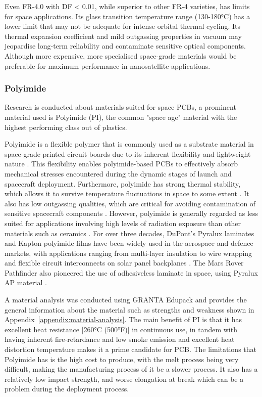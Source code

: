 Even FR-4.0 with DF < 0.01, while superior to other FR-4 varieties, has limits for space applications.
Its glass transition temperature range (130-180°C) has a lower limit that may not be adequate for intense orbital thermal cycling.
Its thermal expansion coefficient and mild outgassing properties in vacuum may jeopardise long-term reliability and contaminate sensitive optical components.
Although more expensive, more specialised space-grade materials would be preferable for maximum performance in nanosatellite applications.

\subsubsection{Polyimide}
Research is conducted about materials suited for space PCBs, a prominent material used is Polyimide (PI), the common "space age" material with the highest performing class out of plastics.

Polyimide is a flexible polymer that is commonly used as a substrate material in space-grade printed circuit boards due to its inherent flexibility and lightweight nature \cite{CadenceDesignSystems2025}. 
This flexibility enables polyimide-based PCBs to effectively absorb mechanical stresses encountered during the dynamic stages of launch and spacecraft deployment.
Furthermore, polyimide has strong thermal stability, which allows it to survive temperature fluctuations in space to some extent \cite{CadenceDesignSystems2025}.
It also has low outgassing qualities, which are critical for avoiding contamination of sensitive spacecraft components \cite{Proto-Electronics2024}.
However, polyimide is generally regarded as less suited for applications involving high levels of radiation exposure than other materials such as ceramics \cite{CadenceDesignSystems2025}. 
For over three decades, DuPont's Pyralux laminates and Kapton polyimide films have been widely used in the aerospace and defence markets, with applications ranging from multi-layer insulation to wire wrapping and flexible circuit interconnects on solar panel backplanes \cite{MobilityEngineeringTech2024}. 
The Mars Rover Pathfinder also pioneered the use of adhesiveless laminate in space, using Pyralux AP material \cite{MobilityEngineeringTech2024}.

A material analysis was conducted using GRANTA Edupack and provides the general information about the material such as strengths and weakness shown in Appendix~\ref{appendix:material-analysis}. 
The main benefit of PI is that it has excellent heat resistance [260°C (500°F)] in continuous use, in tandem with having inherent fire-retardance and low smoke emission and excellent heat distortion temperature makes it a prime candidate for PCB. 
The limitations that Polyimide has is the high cost to produce, with the melt process being very difficult, making the manufacturing process of it be a slower process. 
It also has a relatively low impact strength, and worse elongation at break which can be a problem during the deployment process.

